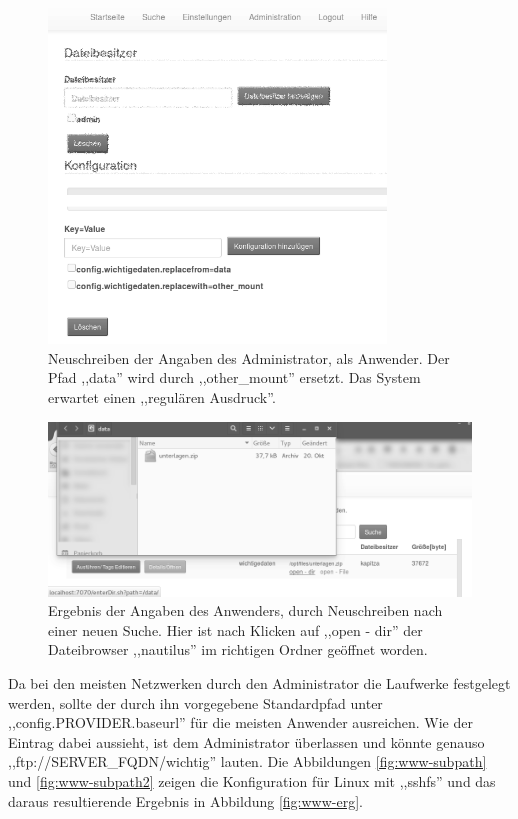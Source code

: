 \documentclass[oneside, ngerman, toc=bibliography,bibliography=totoc,listof=entryprefix, open=right,numbers=noenddot,fontsize=12pt]{scrbook}
\begin{document}
\begin{figure}[htbp] 
    \centering
    \includegraphics[width=0.8\textwidth]{Masterarbeit_Bilder/user_rewrite_other_mount.png}
    \caption{Neuschreiben der Angaben des Administrator, als Anwender. Der Pfad ,,data'' wird durch ,,other\_mount'' ersetzt. Das System erwartet einen ,,regulären Ausdruck''. }
    \label{fig:www-subpath3}
\end{figure}  

\begin{figure}[htbp] 
    \centering
    \includegraphics[width=\textwidth]{Masterarbeit_Bilder/open_mount_dir.png}
    \caption{Ergebnis der Angaben des Anwenders, durch Neuschreiben nach einer neuen Suche. Hier ist nach Klicken auf ,,open - dir'' der Dateibrowser ,,nautilus'' im richtigen Ordner geöffnet worden.}
    \label{fig:www-erg2}
\end{figure}  




Da bei den meisten Netzwerken durch den Administrator die Laufwerke festgelegt werden, sollte der durch ihn vorgegebene Standardpfad unter ,,config.{PROVIDER}.baseurl'' für die meisten Anwender ausreichen. Wie der Eintrag dabei aussieht, ist dem Administrator überlassen und könnte genauso ,,ftp://SERVER\_FQDN/wichtig'' lauten.
Die Abbildungen \ref{fig:www-subpath} und \ref{fig:www-subpath2} zeigen die Konfiguration für Linux mit ,,sshfs'' und das daraus resultierende Ergebnis in Abbildung \ref{fig:www-erg}.
\end{document}
